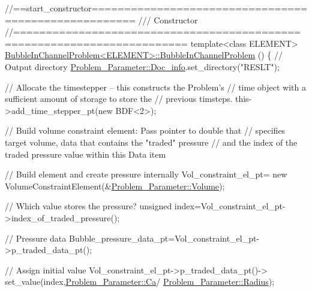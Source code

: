 \begin{DoxyCodeInclude}
\textcolor{comment}{//==start\_constructor=====================================================}
\textcolor{comment}{/// Constructor}
\textcolor{comment}{}\textcolor{comment}{//========================================================================}
\textcolor{keyword}{template}<\textcolor{keyword}{class} ELEMENT>
\hyperlink{classBubbleInChannelProblem_a04bf2f20c65e85228fac381d786bedad}{BubbleInChannelProblem<ELEMENT>::BubbleInChannelProblem}
      ()
\{ 
 \textcolor{comment}{// Output directory}
 \hyperlink{namespaceProblem__Parameter_a1dd3c6bcf97360c8fe0d288ca7610351}{Problem\_Parameter::Doc\_info}.set\_directory(\textcolor{stringliteral}{"RESLT"});
 
 \textcolor{comment}{// Allocate the timestepper -- this constructs the Problem's }
 \textcolor{comment}{// time object with a sufficient amount of storage to store the}
 \textcolor{comment}{// previous timsteps. }
 this->add\_time\_stepper\_pt(\textcolor{keyword}{new} BDF<2>);


 
 \textcolor{comment}{// Build volume constraint element: Pass pointer to double that}
 \textcolor{comment}{// specifies target volume, data that contains the "traded" pressure}
 \textcolor{comment}{// and the index of the traded pressure value within this Data item}

\end{DoxyCodeInclude}



\begin{DoxyCodeInclude}
 \textcolor{comment}{// Build element and create pressure internally}
 Vol\_constraint\_el\_pt= 
  \textcolor{keyword}{new} VolumeConstraintElement(&\hyperlink{namespaceProblem__Parameter_aad8e0a2d1ec39a8dd7357a43bcc5f20e}{Problem\_Parameter::Volume});
 
 \textcolor{comment}{// Which value stores the pressure?}
 \textcolor{keywordtype}{unsigned} index=Vol\_constraint\_el\_pt->index\_of\_traded\_pressure();
 
 \textcolor{comment}{// Pressure data}
 Bubble\_pressure\_data\_pt=Vol\_constraint\_el\_pt->p\_traded\_data\_pt();

 \textcolor{comment}{// Assign initial value}
 Vol\_constraint\_el\_pt->p\_traded\_data\_pt()->
  set\_value(index,\hyperlink{namespaceProblem__Parameter_af6194d2571881779c678fbabc1503d47}{Problem\_Parameter::Ca}/
      \hyperlink{namespaceProblem__Parameter_a903237528f0e9bb92debcc8842576cca}{Problem\_Parameter::Radius});

\end{DoxyCodeInclude}


